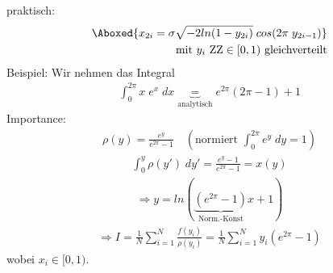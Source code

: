 \documentclass[12pt]{article}
\begin{document}
\begin{itemize}
praktisch: \begin{align}
\Aboxed{x_{2i}= \sigma \sqrt{-2 ln(1-y_{2i})} \; cos(2\pi \; y_{2i-1}) } \\
\mbox{ mit } y_i\mbox{ ZZ} \in [0, 1) \mbox{ gleichverteilt} \nonumber
\end{align}
Beispiel: Wir nehmen das Integral
\begin{align*}
\int_0^{2\pi} x \; e^x \; dx \underbrace{=}_\text{analytisch} e^{2\pi} (2\pi -1) +1
\end{align*} 
Importance: \begin{align*}
\rho(y)= \frac{e^y}{e^{2\pi} -1}\quad  \left( \mbox{normiert } \int_0^{2\pi} e^y \; dy =1 \right) 
\end{align*}
\begin{align*}
\int_0^y \rho(y') \; dy' = \frac{e^y - 1}{e^{2\pi} - 1} = x(y)
\end{align*}
\begin{align*}
 \Rightarrow y= ln(\underbrace{(e^{2\pi}-1)}_\text{Norm.-Konst} x+1) 
 \end{align*}
 \begin{align*}
\Rightarrow  I = \frac{1}{N} \sum_{i=1}^N \frac{f(y_i)}{\rho(y_i)}= \frac{1}{N} \sum_{i=1}^N y_i (e^{2\pi}-1)
\end{align*}
wobei $x_i \in [0,1)$.
\end{itemize}

 
% 
 
\end{document}
